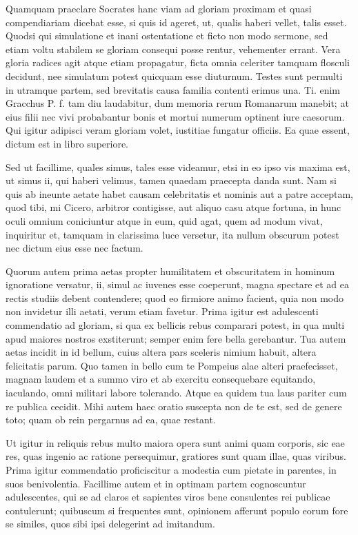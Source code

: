  Quamquam praeclare Socrates hanc viam ad gloriam proximam et quasi compendiariam dicebat esse, si quis id ageret, ut, qualis haberi vellet, talis esset. Quodsi qui simulatione et inani ostentatione et ficto non modo sermone, sed etiam voltu stabilem se gloriam consequi posse rentur, vehementer errant. Vera gloria radices agit atque etiam propagatur, ficta omnia celeriter tamquam flosculi decidunt, nee simulatum potest quicquam esse diuturnum. Testes sunt permulti in utramque partem, sed brevitatis causa familia contenti erimus una. Ti. enim Gracchus P. f. tam diu laudabitur, dum memoria rerum Romanarum manebit; at eius filii nec vivi probabantur bonis et mortui numerum optinent iure caesorum. Qui igitur adipisci veram gloriam volet, iustitiae fungatur officiis. Ea quae essent, dictum est in libro superiore.

 Sed ut facillime, quales simus, tales esse videamur, etsi in eo ipso vis maxima est, ut simus ii, qui haberi velimus, tamen quaedam praecepta danda sunt. Nam si quis ab ineunte aetate habet causam celebritatis et nominis aut a patre acceptam, quod tibi, mi Cicero, arbitror contigisse, aut aliquo casu atque fortuna, in hunc oculi omnium coniciuntur atque in eum, quid agat, quem ad modum vivat, inquiritur et, tamquam in clarissima luce versetur, ita nullum obscurum potest nec dictum eius esse nec factum.

 Quorum autem prima aetas propter humilitatem et obscuritatem in hominum ignoratione versatur, ii, simul ac iuvenes esse coeperunt, magna spectare et ad ea rectis studiis debent contendere; quod eo firmiore animo facient, quia non modo non invidetur illi aetati, verum etiam favetur. Prima igitur est adulescenti commendatio ad gloriam, si qua ex bellicis rebus comparari potest, in qua multi apud maiores nostros exstiterunt; semper enim fere bella gerebantur. Tua autem aetas incidit in id bellum, cuius altera pars sceleris nimium habuit, altera felicitatis parum. Quo tamen in bello cum te Pompeius alae alteri praefecisset, magnam laudem et a summo viro et ab exercitu consequebare equitando, iaculando, omni militari labore tolerando. Atque ea quidem tua laus pariter cum re publica cecidit. Mihi autem haec oratio suscepta non de te est, sed de genere toto; quam ob rein pergarnus ad ea, quae restant.

 Ut igitur in reliquis rebus multo maiora opera sunt animi quam corporis, sic eae res, quas ingenio ac ratione persequimur, gratiores sunt quam illae, quas viribus. Prima igitur commendatio proficiscitur a modestia cum pietate in parentes, in suos benivolentia. Facillime autem et in optimam partem cognoscuntur adulescentes, qui se ad claros et sapientes viros bene consulentes rei publicae contulerunt; quibuscum si frequentes sunt, opinionem afferunt populo eorum fore se similes, quos sibi ipsi delegerint ad imitandum.

